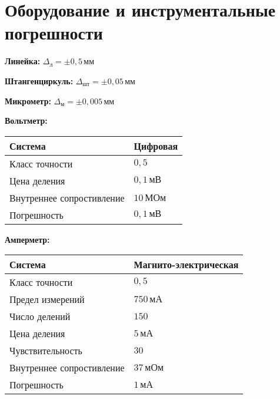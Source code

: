\section{Оборудование и инструментальные погрешности}
\textbf{Линейка:} $\Delta_{\text{л}}=\pm 0{,}5\,\text{мм}$

\textbf{Штангенциркуль:} $\Delta_{\text{шт}}=\pm 0{,}05\,\text{мм}$

\textbf{Микрометр:} $\Delta_{\text{м}}=\pm 0{,}005\,\text{мм}$

\textbf{Вольтметр:}
\begin{table}[h!]
    \begin{tabular}{|l|l|}
    \hline
    Система                   & Цифровая              \\ \hline
    Класс точности            & $0{,}5$               \\ \hline
    Цена деления              & $0{,}1\,\text{мВ}$    \\ \hline
    Внутреннее сопростивление & $10\,\text{МОм}$      \\ \hline
    Погрешность               & $0{,}1\,\text{мВ}$      \\ \hline
    \end{tabular}
\end{table}
\newpage
\textbf{Амперметр:}
\begin{table}[h!]
    \begin{tabular}{|l|l|}
    \hline
    Система                   & Магнито-электрическая \\ \hline
    Класс точности            & $0{,}5$               \\ \hline
    Предел измерений          & $750\,\text{мА}$      \\ \hline
    Число делений             & $150$                 \\ \hline
    Цена деления              & $5\,\text{мА}$         \\ \hline
    Чувствительность          & $30$                  \\ \hline
    Внутреннее сопростивление & $37\,\text{мОм}$      \\ \hline
    Погрешность               & $1\,\text{мА}$          \\ \hline
    \end{tabular}
\end{table}

